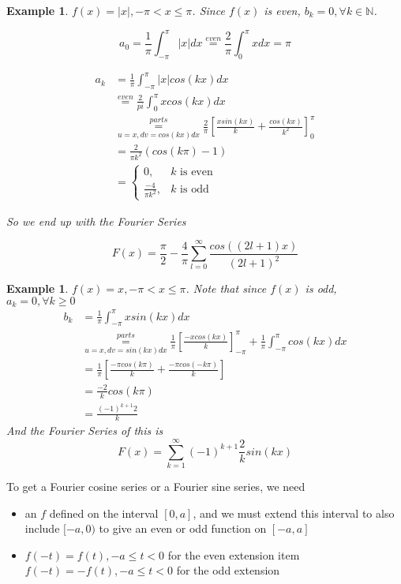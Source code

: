 \documentclass[12pt]{article}
\theoremstyle{plain}
\newtheorem{example}[theorem]{Example}
\theoremstyle{definition}
\begin{document}
\begin{example}
    $f(x) = |x|, -\pi < x \leq \pi$. Since $f(x)$ is even, $b_k=0, \forall k\in\mathbb{N}$.

    $$a_0 = \frac{1}{\pi} \int^\pi_{-\pi} |x|dx \overset{even}{=} \frac{2}{\pi} \int^\pi_0 x dx= \pi$$

   \begin{align*}
   	a_k &= \frac{1}{\pi} \int^\pi_{-\pi} |x| cos(kx) dx\\
	&\overset{even}{=} \frac{2}{pi} \int^\pi_0 x cos(kx) dx\\
	&\underset{u=x, dv=cos(kx)dx}{\overset{parts}{=}} \frac{2}{\pi} [\frac{x sin(kx)}{k} + \frac{cos(kx)}{k^2}]^\pi_0\\
	&= \frac{2}{\pi k^2} (cos(k\pi) - 1)\\
	&=\begin{cases}
		0, &\text{$k$ is even}\\
		\frac{-4}{\pi k^2}, &\text{$k$ is odd}
	\end{cases}
   \end{align*}

   So we end up with the Fourier Series

   $$F(x) = \frac{\pi}{2} - \frac{4}{\pi} \sum^\infty_{l=0} \frac{cos((2l+1)x)}{(2l+1)^2}$$

\end{example}

\begin{example}
	$f(x) = x, -\pi < x \leq \pi$. Note that since $f(x)$ is odd, $a_k = 0, \forall k \geq 0$
	\begin{align*}
		b_k &= \frac{1}{\pi} \int^\pi_{-\pi} x sin(kx) dx\\
		&\underset{u=x, dv=sin(kx)dx}{\overset{parts}{=}} \frac{1}{\pi} [\frac{-xcos(kx)}{k}]^\pi_{-\pi} + \frac{1}{\pi} \int^\pi_{-\pi} cos(kx) dx\\
		&= \frac{1}{\pi} [\frac{-\pi cos(k\pi)}{k} + \frac{-\pi cos(-k\pi)}{k}]\\
		&= \frac{-2}{k} cos(k\pi)\\
		&= \frac{(-1)^{k+1} 2}{k}
	\end{align*}
	And the Fourier Series of this is
	$$F(x) = \sum^\infty_{k=1} (-1)^{k+1} \frac{2}{k} sin(kx)$$
\end{example}

To get a Fourier cosine series or a Fourier sine series, we need
\begin{itemize}
	\item{an $f$ defined on the interval $[0,a]$, and we must extend this interval to also include $[-a,0)$ to give an even or odd function on $[-a,a]$}
	\item{$f(-t)=f(t), -a\leq t < 0$ for the even extension}
	item{$f(-t)=-f(t), -a\leq t < 0$ for the odd extension}
\end{itemize}
\end{document}
